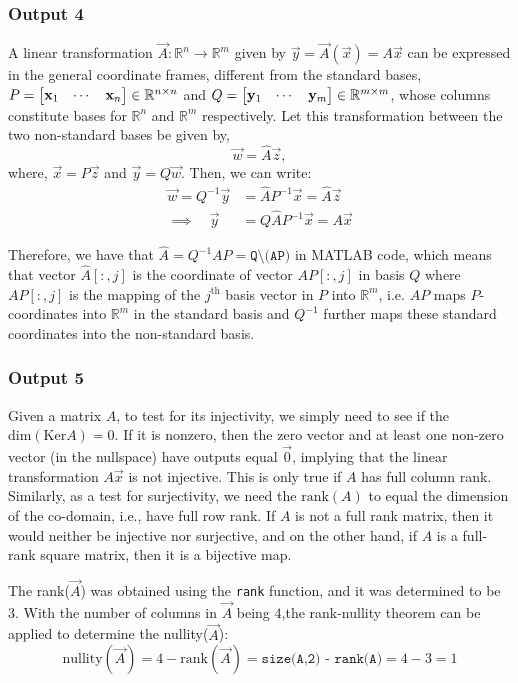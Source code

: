 \documentclass[10pt]{article}
\begin{document}
\subsubsection{Output 4}
A linear transformation $\vec{A} : \mathbb{R}^n \rightarrow \mathbb{R}^m$ given by $\vec{y} = \vec{A}(\vec{x}) = A\vec{x}$ can be expressed in the general coordinate frames, different from the standard bases, $P = \begin{bmatrix} \mathbf{x}_1 & \cdots & \mathbf{x}_n \end{bmatrix} \in \mathbb{R}^{n\times n}$ and $Q = \begin{bmatrix} \mathbf{y}_1 & \cdots & \mathbf{y}_m \end{bmatrix} \in \mathbb{R}^{m\times m}$, whose columns constitute bases for $\mathbb{R}^n$ and $\mathbb{R}^m$ respectively. Let this transformation between the two non-standard bases be given by,
\[
    \vec{w}=\hat{A}\vec{z},
\]
where, $\vec{x}=P\vec{z}$ and $\vec{y} = Q\vec{w}$. Then, we can write:
\begin{align*}
    \vec{w} = Q^{-1}\vec{y} &= \hat{A}P^{-1}\vec{x} = \hat{A}\vec{z}\\
    \implies \quad \vec{y} &= Q\hat{A}P^{-1}\vec{x} = A\vec{x}
\end{align*}

Therefore, we have that $\hat{A} = Q^{-1}AP=\texttt{Q\textbackslash (AP)}$ in \textsc{MATLAB} code, which means that vector ${\hat{A}}[:, j]$ is the coordinate of vector $AP[:, j]$ in basis $Q$ where $AP[:, j]$ is the mapping of the $j^{\text{th}}$ basis vector in $P$ into $\mathbb{R}^m$, i.e. $AP$ maps $P$-coordinates into $\mathbb{R}^m$ in the standard basis and $Q^{-1}$ further maps these standard coordinates into the non-standard basis.

\subsubsection{Output 5}
Given a matrix $A$, to test for its injectivity, we simply need to see if the $\text{dim}(\text{Ker}A) = 0$. If it is nonzero, then the zero vector and at least one non-zero vector (in the nullspace) have outputs equal $\vec{0}$, implying that the linear transformation $A\vec{x}$ is not injective. This is only true if $A$ has full column rank. Similarly, as a test for surjectivity, we need the $\text{rank}(A)$ to equal the dimension of the co-domain, i.e., have full row rank. If $A$ is not a full rank matrix, then it would neither be injective nor surjective, and on the other hand, if $A$ is a full-rank square matrix, then it is a bijective map.

The rank($\vec{A}$) was obtained using the \texttt{rank} function, and it was determined to be $3$. With the number of columns in $\vec{A}$ being $4$,the rank-nullity theorem can be applied to determine the nullity($\vec{A}$):
\begin{equation*}
    \text{nullity}(\vec{A}) = 4 - \text{rank}(\vec{A}) = \texttt{size(A,2) - rank(A)}= 4 - 3 = 1
\end{equation*}
\end{document}
